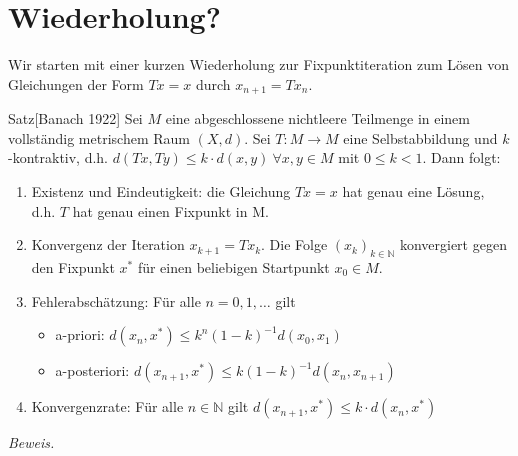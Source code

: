 \documentclass{article}
\begin{document}
\section{Wiederholung?}
Wir starten mit einer kurzen Wiederholung zur Fixpunktiteration zum Lösen von Gleichungen der Form $Tx=x$ durch $x_{n+1}=Tx_n$.

\begin{thmbox}{Satz}[Banach 1922]
    Sei $M$ eine abgeschlossene nichtleere Teilmenge in einem vollständig metrischem Raum $(X,d)$. Sei $T:M\rightarrow M$ eine Selbstabbildung und $k$-kontraktiv, d.h. $d(Tx,Ty)\leq k\cdot d(x,y)\ \forall x,y\in M$ mit $0\leq k < 1$. Dann folgt:
    \begin{enumerate}
        \item Existenz und Eindeutigkeit: die Gleichung $Tx=x$ hat genau eine Lösung, d.h. $T$ hat genau einen Fixpunkt in M.
        \item Konvergenz der Iteration $x_{k+1}=Tx_k$. Die Folge $(x_k)_{k\in\mathbb{N}}$ konvergiert gegen den Fixpunkt $x^*$ für einen beliebigen Startpunkt $x_0\in M$.
        \item Fehlerabschätzung: Für alle $n=0,1,\dotsc$ gilt 
        \begin{itemize}
            \item a-priori: $d(x_n,x^*)\leq k^n(1-k)^{-1}d(x_0,x_1)$
            \item a-posteriori: $d(x_{n+1},x^*)\leq k(1-k)^{-1}d(x_n,x_{n+1})$
        \end{itemize}
        \item Konvergenzrate: Für alle $n\in\mathbb{N}$ gilt $d(x_{n+1},x^*)\leq k\cdot d(x_n,x^*)$
    \end{enumerate}
\end{thmbox}
\textit{Beweis.} 
\end{document}
